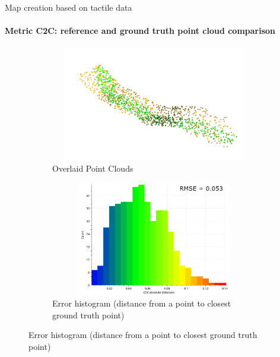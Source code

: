 \documentclass[aspectratio=169,xcolor=table]{beamer}
\begin{document}
\begin{frame}[t]{Map creation based on tactile data}
    \framesubtitle{Metric C2C: reference and ground truth point cloud comparison}
    \vspace{-15pt}
    \begin{figure}[H]
        \begin{subfigure}[t]{0.49\textwidth}
            \centering\includegraphics[height=5cm,width=1\textwidth,keepaspectratio]{cropped_pcd.png}
            \caption*{Overlaid Point Clouds}
        \end{subfigure}
        \begin{subfigure}[t]{0.49\textwidth}
            \centering\includegraphics[height=5cm,width=1\textwidth,keepaspectratio]{pcd_hist.png}
            \caption*{Error histogram (distance from a point to closest ground truth point)}
        \end{subfigure}
    \end{figure}
\end{frame}
\end{document}
